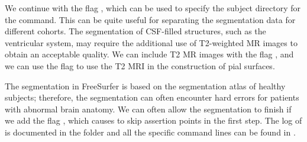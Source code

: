 %
%
We continue with the flag , which can be used to specify the
subject directory for the  command. This can be quite
useful for separating the segmentation data for different
cohorts. The segmentation of CSF-filled structures, such as the
ventricular system, may require the additional use of T2-weighted MR
images to obtain an acceptable quality. We can include T2 MR images with the
flag , and we can use the flag  to use
the T2 MRI in the construction of pial surfaces.

The segmentation in FreeSurfer is based on the segmentation atlas of
healthy subjects; therefore, the segmentation can often encounter hard
errors for patients with abnormal brain anatomy. We can often allow
the segmentation to finish if we add the flag ,
which causes  to skip assertion points in the first step. The
log of  is documented in the folder 
and all the specific command lines can be found in .



